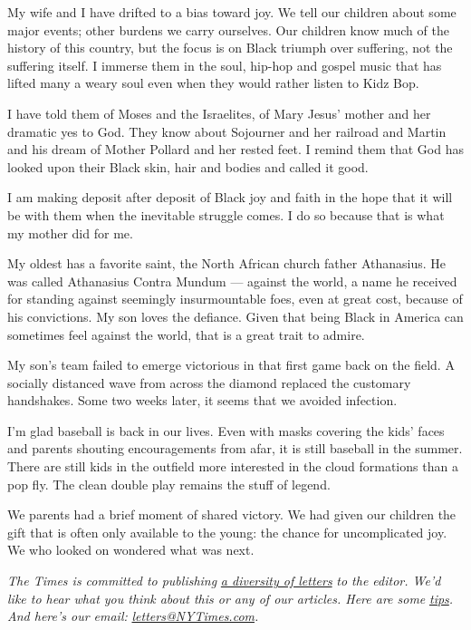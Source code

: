 My wife and I have drifted to a bias toward joy. We tell our children
about some major events; other burdens we carry ourselves. Our children
know much of the history of this country, but the focus is on Black
triumph over suffering, not the suffering itself. I immerse them in the
soul, hip-hop and gospel music that has lifted many a weary soul even
when they would rather listen to Kidz Bop.

I have told them of Moses and the Israelites, of Mary Jesus' mother and
her dramatic yes to God. They know about Sojourner and her railroad and
Martin and his dream of Mother Pollard and her rested feet. I remind
them that God has looked upon their Black skin, hair and bodies and
called it good.

I am making deposit after deposit of Black joy and faith in the hope
that it will be with them when the inevitable struggle comes. I do so
because that is what my mother did for me.

My oldest has a favorite saint, the North African church father
Athanasius. He was called Athanasius Contra Mundum --- against the
world, a name he received for standing against seemingly insurmountable
foes, even at great cost, because of his convictions. My son loves the
defiance. Given that being Black in America can sometimes feel against
the world, that is a great trait to admire.

My son's team failed to emerge victorious in that first game back on the
field. A socially distanced wave from across the diamond replaced the
customary handshakes. Some two weeks later, it seems that we avoided
infection.

I'm glad baseball is back in our lives. Even with masks covering the
kids' faces and parents shouting encouragements from afar, it is still
baseball in the summer. There are still kids in the outfield more
interested in the cloud formations than a pop fly. The clean double play
remains the stuff of legend.

We parents had a brief moment of shared victory. We had given our
children the gift that is often only available to the young: the chance
for uncomplicated joy. We who looked on wondered what was next.

\emph{The Times is committed to publishing}
\href{https://www.nytimes3xbfgragh.onion/2019/01/31/opinion/letters/letters-to-editor-new-york-times-women.html}{\emph{a
diversity of letters}} \emph{to the editor. We'd like to hear what you
think about this or any of our articles. Here are some}
\href{https://help.nytimes3xbfgragh.onion/hc/en-us/articles/115014925288-How-to-submit-a-letter-to-the-editor}{\emph{tips}}\emph{.
And here's our email:}
\href{mailto:letters@NYTimes.com}{\emph{letters@NYTimes.com}}\emph{.}

